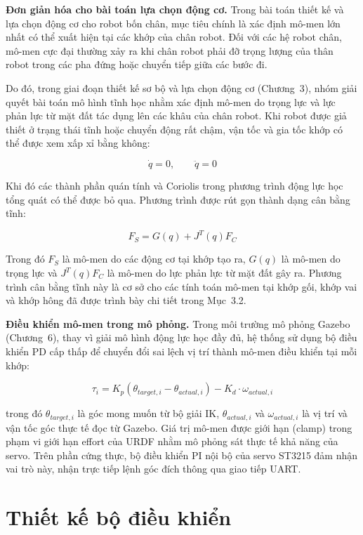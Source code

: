 \textbf{Đơn giản hóa cho bài toán lựa chọn động cơ.} Trong bài toán thiết kế và lựa chọn động cơ cho robot bốn chân, mục tiêu chính là xác định mô-men lớn nhất có thể xuất hiện tại các khớp của chân robot. Đối với các hệ robot chân, mô-men cực đại thường xảy ra khi chân robot phải đỡ trọng lượng của thân robot trong các pha đứng hoặc chuyển tiếp giữa các bước đi.

Do đó, trong giai đoạn thiết kế sơ bộ và lựa chọn động cơ (Chương~3), nhóm giải quyết bài toán mô hình tĩnh học nhằm xác định mô-men do trọng lực và lực phản lực từ mặt đất tác dụng lên các khâu của chân robot. Khi robot được giả thiết ở trạng thái tĩnh hoặc chuyển động rất chậm, vận tốc và gia tốc khớp có thể được xem xấp xỉ bằng không:

\[
\dot{q} = 0, \qquad \ddot{q} = 0
\]

Khi đó các thành phần quán tính và Coriolis trong phương trình động lực học tổng quát có thể được bỏ qua. Phương trình được rút gọn thành dạng cân bằng tĩnh:

\[
F_S = G(q) + J^T(q)F_C
\]

Trong đó $F_S$ là mô-men do các động cơ tại khớp tạo ra, $G(q)$ là mô-men do trọng lực và $J^T(q)F_C$ là mô-men do lực phản lực từ mặt đất gây ra. Phương trình cân bằng tĩnh này là cơ sở cho các tính toán mô-men tại khớp gối, khớp vai và khớp hông đã được trình bày chi tiết trong Mục~3.2.

\textbf{Điều khiển mô-men trong mô phỏng.} Trong môi trường mô phỏng Gazebo (Chương~6), thay vì giải mô hình động lực học đầy đủ, hệ thống sử dụng bộ điều khiển PD cấp thấp để chuyển đổi sai lệch vị trí thành mô-men điều khiển tại mỗi khớp:

\begin{equation}
\tau_i = K_p (\theta_{target,i} - \theta_{actual,i}) - K_d \cdot \omega_{actual,i}
\end{equation}

trong đó $\theta_{target,i}$ là góc mong muốn từ bộ giải IK, $\theta_{actual,i}$ và $\omega_{actual,i}$ là vị trí và vận tốc góc thực tế đọc từ Gazebo. Giá trị mô-men được giới hạn (clamp) trong phạm vi giới hạn effort của URDF nhằm mô phỏng sát thực tế khả năng của servo. Trên phần cứng thực, bộ điều khiển PI nội bộ của servo ST3215 đảm nhận vai trò này, nhận trực tiếp lệnh góc đích thông qua giao tiếp UART.

\section{Thiết kế bộ điều khiển}

